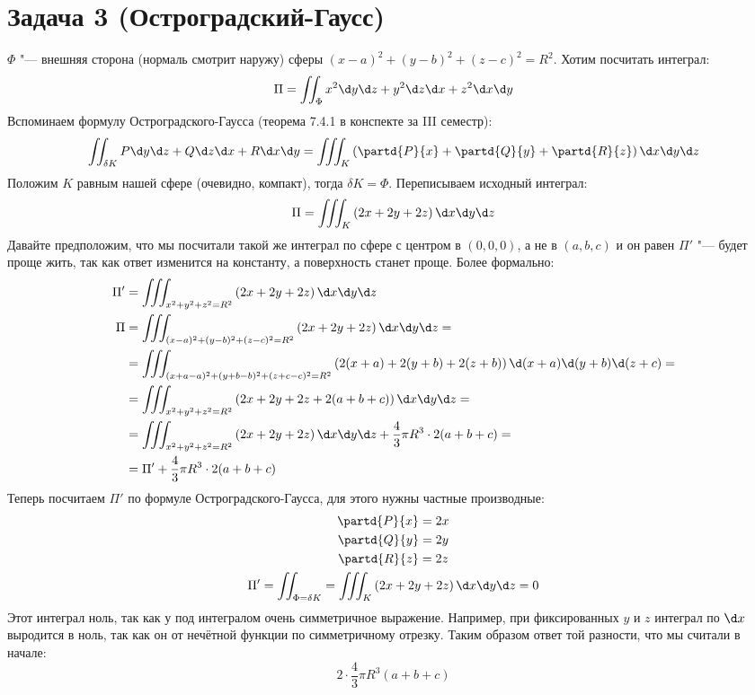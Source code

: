 \section{Задача 3 (Остроградский-Гаусс)}
	$\Phi$ "--- внешняя сторона (нормаль смотрит наружу) сферы $(x-a)^2+(y-b)^2+(z-c)^2=R^2$.
	Хотим посчитать интеграл:
	\[
		\Pi = \iint_{\Phi} x^2\d y \d z + y^2 \d z \d x + z^2 \d x \d y
	\]
	Вспоминаем формулу Остроградского-Гаусса (теорема 7.4.1 в конспекте за III семестр):
	\[
		\iint_{\delta K} P\d y \d z + Q \d z \d x + R\d x \d y =
		\iiint_K \left(\partd{P}{x}+\partd{Q}{y}+\partd{R}{z}\right) \d x \d y \d z
	\]
	Положим $K$ равным нашей сфере (очевидно, компакт), тогда $\delta K = \Phi$.
	Переписываем исходный интеграл:
	\[
		\Pi = \iiint_K \left(2x + 2y + 2z\right) \d x \d y \d z
	\]
	Давайте предположим, что мы посчитали такой же интеграл по сфере с центром в $(0, 0, 0)$,
	а не в $(a, b, c)$ и он равен $\Pi'$ "--- будет проще жить, так как ответ изменится на константу,
	а поверхность станет проще.
	Более формально:
	\begin{align*}
		\Pi' &= \iiint_{x^2+y^2+z^2=R^2} \left(2x+2y+2z\right)\d x \d y \d z \\
		\Pi &= \iiint_{(x-a)^2+(y-b)^2+(z-c)^2=R^2} \left(2x+2y+2z\right)\d x \d y \d z = \\
			&= \iiint_{(x+a-a)^2+(y+b-b)^2+(z+c-c)^2=R^2} \left(2(x+a)+2(y+b)+2(z+b)\right)\d (x+a) \d (y+b) \d (z+c) = \\
			&= \iiint_{x^2+y^2+z^2=R^2} \left(2x+2y+2z+2(a+b+c)\right)\d x \d y \d z = \\
			&= \iiint_{x^2+y^2+z^2=R^2} \left(2x+2y+2z\right)\d x \d y \d z + \frac{4}{3}\pi R^3 \cdot 2(a+b+c)= \\
			&= \Pi' + \frac{4}{3}\pi R^3 \cdot 2(a+b+c)
	\end{align*}
	Теперь посчитаем $\Pi'$ по формуле Остроградского-Гаусса, для этого нужны частные производные:
	\begin{gather*}
		\partd{P}{x} = 2x \\
		\partd{Q}{y} = 2y \\
		\partd{R}{z} = 2z \\
		\Pi' = \iint_{\Phi=\delta K} = \iiint_{K} \left(2x+2y+2z\right)\d x \d y \d z = 0
	\end{gather*}
	Этот интеграл ноль, так как у под интегралом очень симметричное выражение.
	Например, при фиксированных $y$ и $z$ интеграл по $\d x$ выродится в ноль, так как он от нечётной функции
	по симметричному отрезку.
	Таким образом ответ той разности, что мы считали в начале:
	\[2\cdot \frac{4}{3}\pi R^3 (a+b+c) \]

